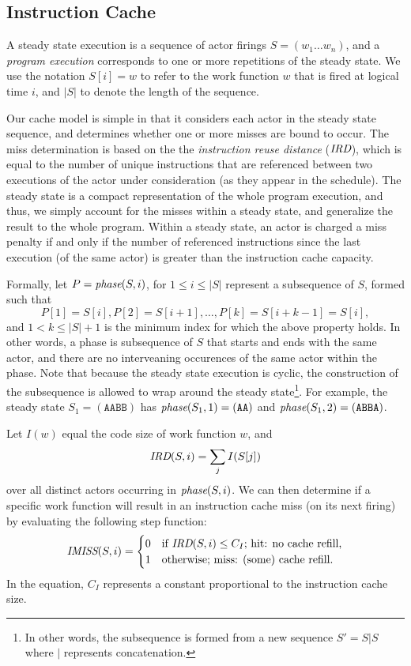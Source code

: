 \subsection{Instruction Cache}

A steady state execution is a sequence of actor firings
$S=(w_1\ldots w_n)$, and a
{\it program execution} corresponds to one or more repetitions of the
steady state. We use the notation $S[i]=w$ to refer to the
work function $w$ that is fired at logical time $i$, and $|S|$ to
denote the length of the sequence. 

Our cache model is simple in that it considers each actor in the
steady state sequence, and determines whether one or more misses are
bound to occur. The miss determination is based on the 
the {\it instruction reuse distance} ($\mbox{\it IRD}$), which is equal to
the number of unique instructions that are referenced between two
executions of the actor under consideration (as they appear in the
schedule). The steady state is a 
compact representation of the whole program execution, and thus, we
simply account for the misses within a steady state, and generalize
the result to the whole program. Within a steady state, an actor is
charged a miss penalty if and only if the number of referenced
instructions since the last execution (of the same actor)
is greater than the instruction cache capacity.

Formally, let $P=\mbox{\it phase}(S,i)$, for $1\le i\le|S|$ represent a
subsequence of $S$,  formed such that 
\[ 
P[1]=S[i], P[2]=S[i+1], \ldots, P[k]=S[i+k-1]=S[i],
\]
and $1 < k \le |S|+1$ is the minimum index for which
the above property holds.  
In other words, a phase is subsequence of $S$ that starts and ends
with the same actor, and there are no interveaning occurences of the
same actor within the phase. Note that because the steady state
execution is cyclic, the 
construction of the subsequence is allowed to wrap around the steady
state\footnote{In other words, the subsequence is formed from a new
sequence $S'=S|S$ where $|$ represents concatenation.}. For example,
the steady state $S_1=(\texttt{AABB})$ has
$\mbox{\it phase}(S_1,1)=(\texttt{AA})$ and
$\mbox{\it phase}(S_1,2)=(\texttt{ABBA})$.

Let $I(w)$ equal the code size of work function $w$, and
\[
\mbox{\it IRD}(S,i)=\sum_j I(S[j])
\]
over all distinct actors occurring in
$\mbox{\it phase}(S,i)$. We can then determine if a specific work function will
result in an instruction cache miss (on its next firing) by evaluating
the following step function:
\begin{equation}
\label{eq:imiss}
  \mbox{\it IMISS}(S,i) =
    \begin{cases}
      0& \text{if $\mbox{\it IRD}(S,i) \leq C_I$; hit: no cache refill,}\\
      1& \text{otherwise; miss: (some) cache refill.}
    \end{cases}
\end{equation}
In the equation, $C_I$ represents a constant proportional to the
instruction cache size. 


